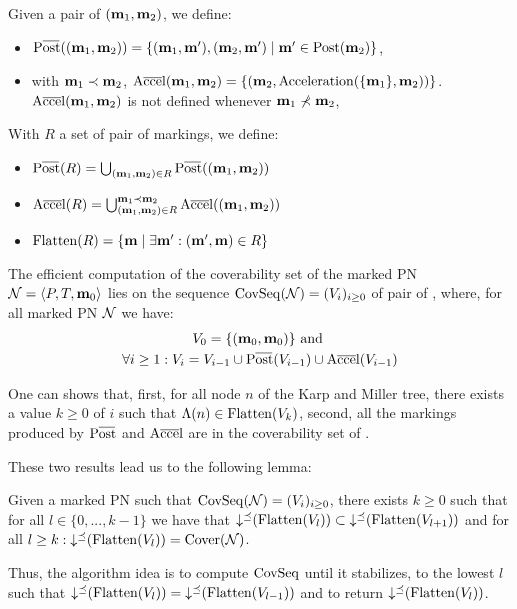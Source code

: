 Given a pair of \omarks $(\mathbf{m}_1, \mathbf{m}_2)$, we define:
\begin{itemize}
  \item $\Postb((\marq_1, \marq_2)) = \{(\marq_1, \marqp), (\marq_2, \marqp) \mid \marqp \in \Post(\marq_2)\}$,
  \item with $\mathbf{m}_1 \prec \mathbf{m}_2$, $\operatorname{A\overline{cce}l}(\mathbf{m}_1, \mathbf{m}_2) = \{(\mathbf{m}_2, \operatorname{Acceleration}(\{\mathbf{m}_1\}, \mathbf{m}_2))\}$.
    $\operatorname{A\overline{cce}l}(\mathbf{m}_1, \mathbf{m}_2)$ is not defined whenever $\mathbf{m}_1 \nprec \mathbf{m}_2$,
\end{itemize}

With $R$ a set of pair of markings, we define:
\begin{itemize}
  \item $\Postb(R) = \bigcup_{(\marq_1, \marq_2) \in R} \Postb((\marq_1, \marq_2))$
  \item $\operatorname{A\overline{cce}l}(R) = \bigcup_{(\mathbf{m}_1, \mathbf{m}_2) \in R}^{\mathbf{m}_1 \prec \mathbf{m}_2} \operatorname{A\overline{cce}l}((\mathbf{m}_1, \mathbf{m}_2))$
  \item $\operatorname{Flatten}(R) = \{\mathbf{m} \mid \exists \mathbf{m'} : (\mathbf{m'}, \mathbf{m}) \in R\}$
\end{itemize}

The efficient computation of the coverability set of the marked \ac{PN} $\mathcal{N} = \langle P,T, \mathbf{m}_0\rangle$ lies on the sequence $\operatorname{CovSeq}(\mathcal{N}) = (V_i)_{i \geq 0}$ of pair of \omarks, where, for all marked \ac{PN} $\mathcal{N}$ we have:
\begin{gather*}
  V_0 = \{(\marqi, \marqi)\} \text{ and } \\
  \forall i \geq 1 : V_i = V_{i-1} \cup \Postb(V_{i-1}) \cup \Accelb(V_{i-1})
\end{gather*}

One can shows that,
first, for all node $n$ of the Karp and Miller tree, there exists a value $k \geq 0$ of $i$ such that $\Lambda(n) \in \operatorname{Flatten}(V_k)$,
second, all the markings produced by $\Postb$ and $\operatorname{A\overline{cce}l}$ are in the coverability set of \tupleN.

These two results lead us to the following lemma:
\begin{lemm}
  Given a marked \ac{PN} \tupleN such that $\operatorname{CovSeq}(\mathcal{N}) = (V_i)_{i \geq 0}$,
  there exists $k \geq 0$ such that for all $l \in \{0, ..., k-1\}$ we have that $\operatorname{\downarrow^\preceq}(\operatorname{Flatten}(V_l)) \subset \operatorname{\downarrow^\preceq}(\operatorname{Flatten}(V_{l+1}))$
  and for all $l \geq k : \operatorname{\downarrow^\preceq}(\operatorname{Flatten}(V_l)) = \operatorname{Cover}(\mathcal{N})$.
\end{lemm}

Thus, the algorithm idea is to compute $\operatorname{CovSeq}$ until it stabilizes,  to the lowest $l$ such that $\operatorname{\downarrow^\preceq}(\operatorname{Flatten}(V_l)) = \operatorname{\downarrow^\preceq}(\operatorname{Flatten}(V_{l-1}))$ and to return $\operatorname{\downarrow^\preceq}(\operatorname{Flatten}(V_l))$.

